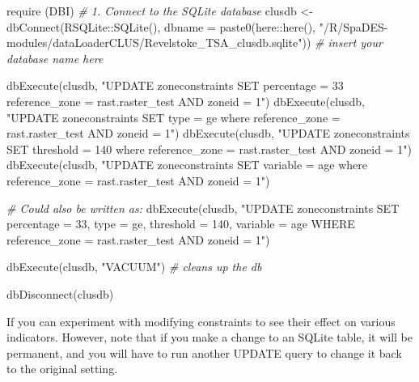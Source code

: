 \documentclass[
]{article}
\newenvironment{Shaded}{\begin{snugshade}}{\end{snugshade}}
\newcommand{\AttributeTok}[1]{\textcolor[rgb]{0.77,0.63,0.00}{#1}}
\newcommand{\CommentTok}[1]{\textcolor[rgb]{0.56,0.35,0.01}{\textit{#1}}}
\newcommand{\FunctionTok}[1]{\textcolor[rgb]{0.00,0.00,0.00}{#1}}
\newcommand{\NormalTok}[1]{#1}
\newcommand{\OtherTok}[1]{\textcolor[rgb]{0.56,0.35,0.01}{#1}}
\newcommand{\SpecialCharTok}[1]{\textcolor[rgb]{0.00,0.00,0.00}{#1}}
\newcommand{\StringTok}[1]{\textcolor[rgb]{0.31,0.60,0.02}{#1}}
\begin{document}
\begin{Shaded}
\begin{Highlighting}[]
\FunctionTok{require}\NormalTok{ (DBI)}
\CommentTok{\# 1. Connect to the SQLite database}
\NormalTok{clusdb }\OtherTok{\textless{}{-}} \FunctionTok{dbConnect}\NormalTok{(RSQLite}\SpecialCharTok{::}\FunctionTok{SQLite}\NormalTok{(), }\AttributeTok{dbname =} \FunctionTok{paste0}\NormalTok{(here}\SpecialCharTok{::}\FunctionTok{here}\NormalTok{(), }\StringTok{"/R/SpaDES{-}modules/dataLoaderCLUS/Revelstoke\_TSA\_clusdb.sqlite"}\NormalTok{)) }\CommentTok{\# insert your database name here}

\FunctionTok{dbExecute}\NormalTok{(clusdb, }\StringTok{"UPDATE zoneconstraints SET percentage = 33 reference\_zone = \textquotesingle{}rast.raster\_test\textquotesingle{} AND zoneid = 1"}\NormalTok{) }
\FunctionTok{dbExecute}\NormalTok{(clusdb, }\StringTok{"UPDATE zoneconstraints SET type = \textquotesingle{}ge\textquotesingle{} where reference\_zone = \textquotesingle{}rast.raster\_test\textquotesingle{} AND zoneid = 1"}\NormalTok{) }
\FunctionTok{dbExecute}\NormalTok{(clusdb, }\StringTok{"UPDATE zoneconstraints SET threshold = 140 where reference\_zone = \textquotesingle{}rast.raster\_test\textquotesingle{} AND zoneid = 1"}\NormalTok{) }
\FunctionTok{dbExecute}\NormalTok{(clusdb, }\StringTok{"UPDATE zoneconstraints SET variable = \textquotesingle{}age\textquotesingle{} where reference\_zone = \textquotesingle{}rast.raster\_test\textquotesingle{} AND zoneid = 1"}\NormalTok{) }

\CommentTok{\# Could also be written as:}
\FunctionTok{dbExecute}\NormalTok{(clusdb, }\StringTok{"UPDATE zoneconstraints SET percentage = 33, type = \textquotesingle{}ge\textquotesingle{}, threshold = 140, variable = \textquotesingle{}age\textquotesingle{} WHERE reference\_zone = \textquotesingle{}rast.raster\_test\textquotesingle{} AND zoneid = 1"}\NormalTok{) }

\FunctionTok{dbExecute}\NormalTok{(clusdb, }\StringTok{"VACUUM"}\NormalTok{) }\CommentTok{\# cleans up the db  }

\FunctionTok{dbDisconnect}\NormalTok{(clusdb)}
\end{Highlighting}
\end{Shaded}

If you can experiment with modifying constraints to see their effect on
various indicators. However, note that if you make a change to an SQLite
table, it will be permanent, and you will have to run another UPDATE
query to change it back to the original setting.
\end{document}
